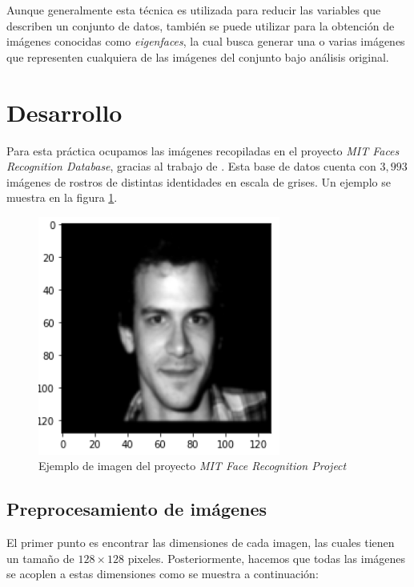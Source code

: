 \documentclass[conference]{IEEEtran}
\begin{document}
Aunque generalmente esta técnica es utilizada para reducir las variables que describen un conjunto de datos, también se puede utilizar para la obtención de imágenes conocidas como \textit{eigenfaces}, la cual busca generar una o varias imágenes que representen cualquiera de las imágenes del conjunto bajo análisis original.


\section{Desarrollo}

Para esta práctica ocupamos las imágenes recopiladas en el proyecto \textit{MIT Faces Recognition Database}, gracias al trabajo de \cite{szummer}. Esta base de datos cuenta con $3,993$ imágenes de rostros de distintas identidades en escala de grises. Un ejemplo se muestra en la figura \ref{fig:face_1000}.

\begin{figure}[H]
    \centering
    \includegraphics[scale=0.3]{imgs/face_1000.png}
    \caption{Ejemplo de imagen del proyecto \textit{MIT Face Recognition Project}}
    \label{fig:face_1000}
\end{figure}

\subsection{Preprocesamiento de imágenes}
El primer punto es encontrar las dimensiones de cada imagen, las cuales tienen un tamaño de $128\times 128$ pixeles. Posteriormente, hacemos que todas las imágenes se acoplen a estas dimensiones como se muestra a continuación: 
\end{document}
